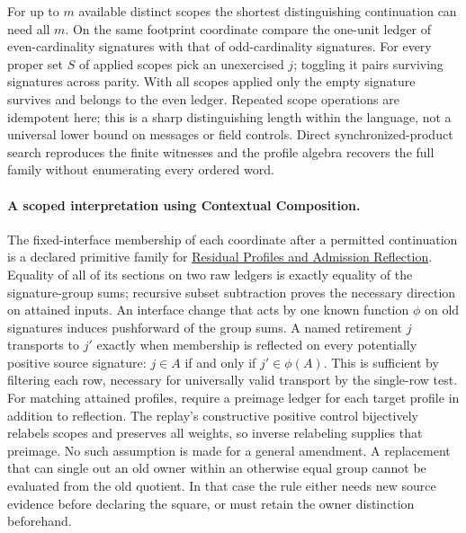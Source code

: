 \documentclass{article}
\begin{document}
For up to $m$ available distinct scopes the shortest distinguishing continuation can need all $m$. On the same footprint coordinate compare the one-unit ledger of even-cardinality signatures with that of odd-cardinality signatures. For every proper set $S$ of applied scopes pick an unexercised $j$; toggling it pairs surviving signatures across parity. With all scopes applied only the empty signature survives and belongs to the even ledger. Repeated scope operations are idempotent here; this is a sharp distinguishing length within the language, not a universal lower bound on messages or field controls. Direct synchronized-product search reproduces the finite witnesses and the profile algebra recovers the full family without enumerating every ordered word.

\paragraph{A scoped interpretation using Contextual Composition.}
The fixed-interface membership of each coordinate after a permitted continuation is a declared primitive family for \href{https://github.com/eternal-november/eos-research-programmes/blob/main/projects/contextual-composition/feedback-and-concurrency/observable-covers/Residual_Profiles_and_Admission_Reflection.tex}{Residual Profiles and Admission Reflection}. Equality of all of its sections on two raw ledgers is exactly equality of the signature-group sums; recursive subset subtraction proves the necessary direction on attained inputs. An interface change that acts by one known function $\phi$ on old signatures induces pushforward of the group sums. A named retirement $j$ transports to $j'$ exactly when membership is reflected on every potentially positive source signature: $j\in A$ if and only if $j'\in\phi(A)$. This is sufficient by filtering each row, necessary for universally valid transport by the single-row test. For matching attained profiles, require a preimage ledger for each target profile in addition to reflection. The replay's constructive positive control bijectively relabels scopes and preserves all weights, so inverse relabeling supplies that preimage. No such assumption is made for a general amendment. A replacement that can single out an old owner within an otherwise equal group cannot be evaluated from the old quotient. In that case the rule either needs new source evidence before declaring the square, or must retain the owner distinction beforehand.
\end{document}
